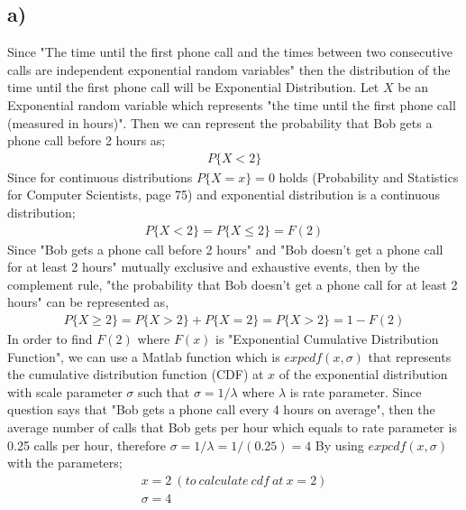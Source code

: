 \documentclass[12pt]{article}
\begin{document}
\subsection*{a)} Since "The time until the first phone call and the
times between two consecutive calls are independent exponential random variables" then the distribution of the time until the first phone call will be Exponential Distribution. Let $X$ be an Exponential random variable which represents "the time until the first phone call (measured in hours)". Then we can represent the probability that Bob gets a phone call before 2 hours as;
\begin{equation*} 
\begin{split}
P\{ X<2 \}
\end{split}
\end{equation*}
Since for continuous distributions
$P\{X=x\} = 0$ holds (Probability and Statistics for Computer Scientists, page 75) and exponential distribution is a continuous distribution;
\begin{equation*} 
\begin{split}
P\{ X<2 \} = P\{ X \leq 2\} = F(2)
\end{split}
\end{equation*}
Since "Bob gets a phone call before 2 hours" and "Bob doesn't get a phone call for at least 2 hours" mutually exclusive and exhaustive events, then by the complement rule, "the probability that Bob doesn't get a phone call for at least 2 hours" can be represented as,
\begin{equation} 
\begin{split}
P\{ X \geq 2 \} = P\{ X > 2 \} + P\{X=2\} = P\{ X > 2 \} = 1 - F(2)
\end{split}
\end{equation}
In order to find $F(2)$ where $F(x)$ is "Exponential Cumulative Distribution Function", we can use a Matlab function which is $expcdf(x,\sigma)$ that represents the cumulative distribution function (CDF) at $x$ of the exponential distribution with scale parameter $\sigma$ such that $\sigma = 1/\lambda$ where $\lambda$ is rate parameter. Since question says that "Bob gets a phone call every 4 hours on average", then the average number of calls that Bob gets per hour which equals to rate parameter is 0.25 calls per hour, therefore $\sigma = 1/\lambda = 1/(0.25) = 4$ By using $expcdf(x,\sigma)$ with the parameters;
\begin{equation*} 
\begin{split}
x = 2\ (to\ calculate\ cdf\ at\ x=2) \\
\sigma = 4 
\end{split}
\end{equation*}
\end{document}
